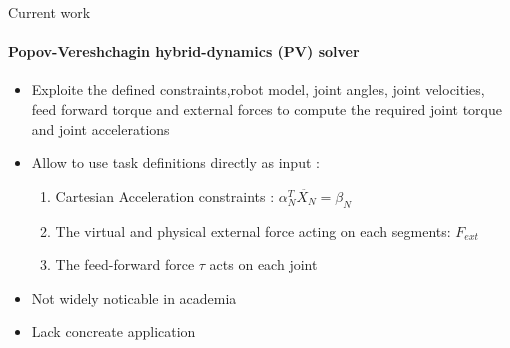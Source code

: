 \documentclass[aspectratio=169]{beamer}
\begin{document}
\begin{frame}{Current work}
    \framesubtitle{Popov-Vereshchagin hybrid-dynamics (PV) solver }
  \begin{itemize}
    \item Exploite the defined constraints,robot model, joint angles, joint velocities, feed forward torque and external forces to compute the required joint torque and joint accelerations \cite{vereshchagin1989modeling} 
    \item Allow to use task definitions directly as input \cite{vereshchagin1974computer}:
    \begin{enumerate}
      \item Cartesian Acceleration constraints : $\alpha_N^T \ddot{X_N} = \beta_N$
      \item The virtual and physical external force acting on each segments: $F_{ext}$
      \item The feed-forward force $\tau$ acts on each joint
    \end{enumerate}
    \item Not widely noticable in academia 
    \item Lack concreate application \cite{kulkarni2019applying}
\end{itemize}
\end{frame}
\end{document}
